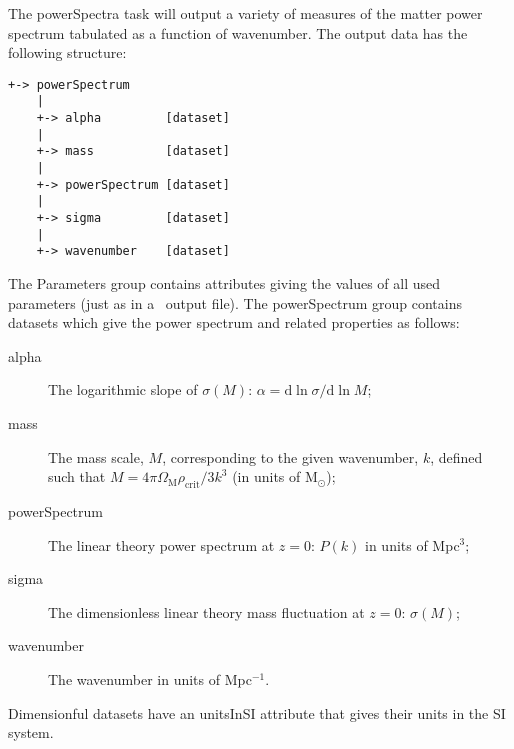 The {\normalfont \ttfamily powerSpectra} task will output a variety of measures of the matter power spectrum tabulated as a function of wavenumber. The output data has the following structure:
\begin{verbatim}
+-> powerSpectrum
    |
    +-> alpha         [dataset]
    |
    +-> mass          [dataset]
    |
    +-> powerSpectrum [dataset]
    |
    +-> sigma         [dataset]
    |
    +-> wavenumber    [dataset]
\end{verbatim}
The {\normalfont \ttfamily Parameters} group contains attributes giving the values of all used parameters (just as in a \glc\ output file). The {\normalfont \ttfamily powerSpectrum} group contains datasets which give the power spectrum and related properties as follows:
\begin{description}
\item [{\normalfont \ttfamily alpha}] The logarithmic slope of $\sigma(M)$: $\alpha = \mathrm{d} \ln \sigma / \mathrm{d} \ln M$;
\item [{\normalfont \ttfamily mass}] The mass scale, $M$, corresponding to the given wavenumber, $k$, defined such that $M=4 \pi \Omega_\mathrm{M} \rho_\mathrm{crit} / 3 k^3$ (in units of $\mathrm{M}_\odot$);
\item [{\normalfont \ttfamily powerSpectrum}] The linear theory power spectrum at $z=0$: $P(k)$ in units of Mpc$^3$;
\item [{\normalfont \ttfamily sigma}] The dimensionless linear theory mass fluctuation at $z=0$: $\sigma(M)$;
\item [{\normalfont \ttfamily wavenumber}] The wavenumber in units of Mpc$^{-1}$.
\end{description}
Dimensionful datasets have an {\normalfont \ttfamily unitsInSI} attribute that gives their units in the SI system.
